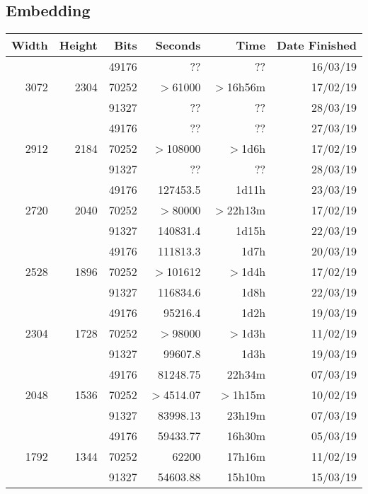 \subsection{Embedding}
  \begin{center}
  \begin{tabular}{ r r r | r r r }
  Width & Height & Bits & Seconds & Time & Date Finished \\ \hline
  \multirow{3}{*}{3072} & \multirow{3}{*}{2304} & 49176 & ?? & ?? & 16/03/19 \\ %
  & & 70252 & $>$61000 & $>$16h56m & 17/02/19 \\
  & & 91327 & ?? & ?? & 28/03/19 \\ %
  \hline
  \multirow{3}{*}{2912} & \multirow{3}{*}{2184} & 49176 & ?? & ?? & 27/03/19 \\ %
  & & 70252 & $>$108000 & $>$1d6h & 17/02/19 \\
  & & 91327 & ?? & ?? & 28/03/19 \\ %
  \hline
  \multirow{3}{*}{2720} & \multirow{3}{*}{2040} & 49176 & 127453.5 & 1d11h & 23/03/19 \\
  & & 70252 & $>$80000 & $>$22h13m & 17/02/19 \\
  & & 91327 & 140831.4 & 1d15h & 22/03/19 \\
  \hline
  \multirow{3}{*}{2528} & \multirow{3}{*}{1896} & 49176 & 111813.3 & 1d7h & 20/03/19 \\
  & & 70252 & $>$101612 & $>$1d4h & 17/02/19 \\
  & & 91327 & 116834.6 & 1d8h & 22/03/19 \\
  \hline
  \multirow{3}{*}{2304} & \multirow{3}{*}{1728} & 49176 & 95216.4 & 1d2h & 19/03/19 \\
  & & 70252 & $>$98000 & $>$1d3h & 11/02/19 \\
  & & 91327 & 99607.8 & 1d3h & 19/03/19 \\
  \hline
  \multirow{3}{*}{2048} & \multirow{3}{*}{1536} & 49176 & 81248.75 & 22h34m & 07/03/19 \\
  & & 70252 & $>$4514.07 & $>$1h15m & 10/02/19 \\
  & & 91327 & 83998.13 & 23h19m & 07/03/19 \\
  \hline
  \multirow{3}{*}{1792} & \multirow{3}{*}{1344} & 49176 & 59433.77 & 16h30m & 05/03/19 \\
  & & 70252 & 62200 & 17h16m & 11/02/19 \\
  & & 91327 & 54603.88 & 15h10m & 15/03/19 \\

\end{tabular}
\end{center}
